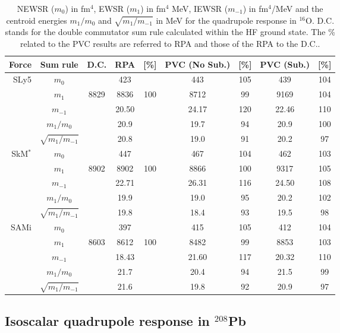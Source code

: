 \documentclass[12pt,a4paper,final]{iopart}
\begin{document}
\begin{table}[t!]
\caption{\label{tab2}  NEWSR ($m_0$) in fm$^4$, EWSR ($m_1$) in fm$^4$ MeV, IEWSR ($m_{-1}$) in fm$^4$/MeV and the centroid energies $m_1/m_0$ and $\sqrt{m_1/m_{-1}}$ in MeV for the quadrupole response in ${}^{16}$O. D.C. stands for the double commutator sum rule  calculated within the HF ground state. The \% related to the PVC results are referred to RPA and those of the RPA to the D.C..} 
\begin{center}
\begin{tabular}{rcccccccc}
 \hline\hline
Force &Sum rule& D.C. & RPA & [\%] & PVC (No Sub.) & [\%]& PVC (Sub.) & [\%]\\
 \hline
SLy5   &$m_{ 0}$&    &423& &443&105 &439& 104\\
       &$m_{ 1}$& 8829 & 8836 & 100 &8712 & 99&9169 & 104\\
       &$m_{-1}$&      & 20.50&     &24.17&120&22.46& 110\\
       &$m_{ 1}/m_0$&    &20.9& &19.7&94 &20.9& 100\\
       &$\sqrt{m_1/m_{-1}}$& &20.8 & & 19.0 &91 & 20.2 &97 \\
 \hline
SkM$^*$&$m_{ 0}$&    &447& &467&104 &462& 103\\
       &$m_{ 1}$& 8902 & 8902 & 100 &8866 &100&9317 & 105\\
       &$m_{-1}$&      & 22.71&     &26.31&116&24.50&108\\
       &$m_{ 1}/m_0$&    &19.9& &19.0& 95&20.2& 102\\
       &$\sqrt{m_1/m_{-1}}$& &19.8 & &  18.4 &93 &  19.5 & 98\\
 \hline
SAMi   &$m_{ 0}$&    &397& &415&105 &412& 104\\
       &$m_{ 1}$& 8603 & 8612 & 100 &8482 & 99&8853 & 103\\ 
       &$m_{-1}$&      & 18.43&     &21.60&117&20.32& 110\\
       &$m_{ 1}/m_0$&    &21.7& &20.4& 94&21.5& 99\\
       &$\sqrt{m_1/m_{-1}}$& &21.6 & &  19.8 & 92&  20.9 & 97\\
 \hline\hline
\end{tabular}
\end{center}
\end{table} 

\subsection{Isoscalar quadrupole response in ${}^{208}$Pb}  
\end{document}

